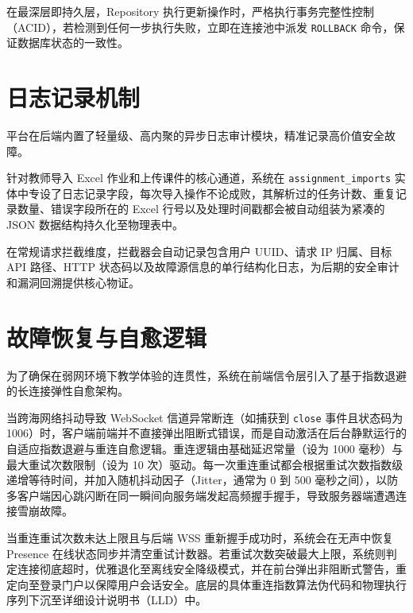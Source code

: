 在最深层即持久层，Repository 执行更新操作时，严格执行事务完整性控制（ACID），若检测到任何一步执行失败，立即在连接池中派发 \texttt{ROLLBACK} 命令，保证数据库状态的一致性。

\section{日志记录机制}
平台在后端内置了轻量级、高内聚的异步日志审计模块，精准记录高价值安全故障。

针对教师导入 Excel 作业和上传课件的核心通道，系统在 \texttt{assignment\_imports} 实体中专设了日志记录字段，每次导入操作不论成败，其解析过的任务计数、重复记录数量、错误字段所在的 Excel 行号以及处理时间戳都会被自动组装为紧凑的 JSON 数据结构持久化至物理表中。

在常规请求拦截维度，拦截器会自动记录包含用户 UUID、请求 IP 归属、目标 API 路径、HTTP 状态码以及故障源信息的单行结构化日志，为后期的安全审计和漏洞回溯提供核心物证。

\section{故障恢复与自愈逻辑}
为了确保在弱网环境下教学体验的连贯性，系统在前端信令层引入了基于指数退避的长连接弹性自愈架构。

当跨海网络抖动导致 WebSocket 信道异常断连（如捕获到 \texttt{close} 事件且状态码为 1006）时，客户端前端并不直接弹出阻断式错误，而是自动激活在后台静默运行的自适应指数退避与重连自愈逻辑。重连逻辑由基础延迟常量（设为 1000 毫秒）与最大重试次数限制（设为 10 次）驱动。每一次重连重试都会根据重试次数指数级递增等待时间，并加入随机抖动因子（Jitter，通常为 0 到 500 毫秒之间），以防多客户端因心跳闪断在同一瞬间向服务端发起高频握手握手，导致服务器端遭遇连接雪崩故障。

当重连重试次数未达上限且与后端 WSS 重新握手成功时，系统会在无声中恢复 Presence 在线状态同步并清空重试计数器。若重试次数突破最大上限，系统则判定连接彻底超时，优雅退化至离线安全降级模式，并在前台弹出非阻断式警告，重定向至登录门户以保障用户会话安全。底层的具体重连指数算法伪代码和物理执行序列下沉至详细设计说明书（LLD）中。
